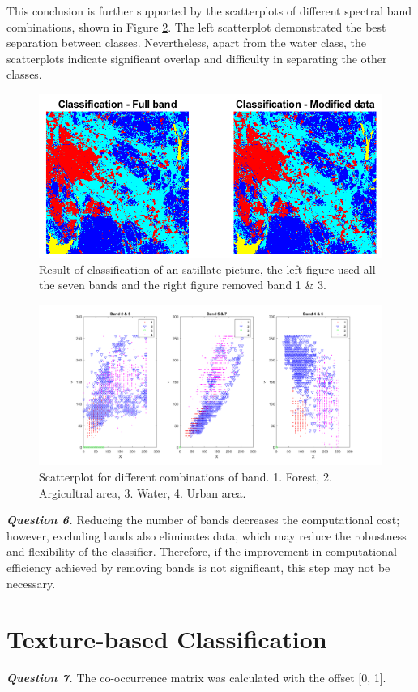 \documentclass[12pt]{article}
\begin{document}
This conclusion is further supported by the scatterplots of different spectral band combinations, shown in Figure \ref{fig:Q5_scatter}. The left scatterplot demonstrated the best separation between classes. Nevertheless, apart from the water class, the scatterplots indicate significant overlap and difficulty in separating the other classes.
\begin{figure}
  \centering
  \includegraphics[width = 15cm]{images/Q5_result.png}
  \caption{Result of classification of an satillate picture, the left figure used all the seven bands and the right figure removed band 1 \& 3.}
  \label{fig:Q5_res}
\end{figure}

\begin{figure}
  \centering
  \includegraphics[width = 15cm]{images/Q5_scatter.png}
  \caption{Scatterplot for different combinations of band. 1. Forest, 2. Argicultral area, 3. Water, 4. Urban area. }
  \label{fig:Q5_scatter}
\end{figure}

\textbf{\emph{Question 6.}}
Reducing the number of bands decreases the computational cost; however, excluding bands also eliminates data, which may reduce the robustness and flexibility of the classifier. Therefore, if the improvement in computational efficiency achieved by removing bands is not significant, this step may not be necessary.
\section{Texture-based Classification}
\textbf{\emph{Question 7.}}
The co-occurrence matrix was calculated with the offset [0, 1].
\end{document}
